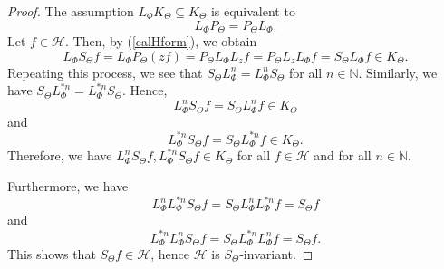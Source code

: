 \documentclass{amsart}
\theoremstyle{definition}
\newcommand{\h}{\mathcal{\mathcal H}}
\begin{document}
\begin{proof}  The assumption $L_{\Phi} K_{\Theta}\subseteq K_\Theta$ is equivalent to $$L_{\Phi}P_{\Theta}=P_{\Theta}L_{\Phi}.$$
    Let $f\in \h$. Then, by (\ref{calHform}), we obtain %
$$L_\Phi S_\Theta f=L_\Phi P_\Theta (zf)=P_\Theta L_\Phi L_z f=P_\Theta L_z L_\Phi f=S_{\Theta}L_\Phi f\in K_\Theta.$$
Repeating this process, we see that $S_\Theta L^n_\Phi=L^{n}_{\Phi}S_\Theta$ for all $n\in \mathbb{N}$. Similarly, we have $S_\Theta L^{*n}_\Phi=L^{*n}_{\Phi}S_\Theta$.
Hence,
    $$L^n_{\Phi}S_\Theta f=S_\Theta L^n_\Phi f\in K_\Theta$$ and
    $$L^{*n}_{\Phi}S_\Theta f=S_\Theta L^{*n}_\Phi f\in K_\Theta.$$
     Therefore, we have
    $L_{\Phi}^n S_\Theta f, L_{\Phi}^{*n} S_\Theta f\in K_\Theta$ for all $f\in \h$ and for all $n\in \mathbb{N}$.

    Furthermore, we have
    $$L^n_{\Phi}L^{*n}_{\Phi}S_\Theta f=S_\Theta L^n_{\Phi}L^{*n}_{\Phi} f=S_\Theta f$$
    and
    $$L^{*n}_{\Phi}L^{n}_{\Phi}S_\Theta f=S_\Theta L^{*n}_{\Phi}L^{n}_{\Phi} f=S_\Theta f.$$
This shows that $S_\Theta f\in \h$, hence $\h$ is $S_\Theta$-invariant.\end{proof}
\end{document}
